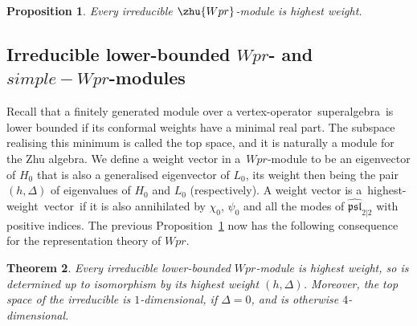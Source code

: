\documentclass[10pt,a4paper]{amsart}
\numberwithin{equation}{section}
\newcommand{\kk}{\mathsf{k}} %
\newcommand{\alg}[1]{\mathfrak{#1}} %
\newcommand{\VOA}[1]{\mathsf{#1}} %
\newcommand{\affine}[1]{\widehat{#1}}
\newcommand{\AKMSA}[3]{\affine{\alg{#1}}_{#2 \vert #3}} %
\newcommand{\apsl}{\AKMSA{psl}{2}{2}}
\newcommand{\uwalg}[2]{\VOA{W}^{#1}_{\mathrm{#2}}} %
\newcommand{\swalg}[2]{\VOA{W}_{#1}^{\mathrm{#2}}} %
\newcommand{\upr}[1][\kk]{\uwalg{#1}{pr}} %
\newcommand{\spr}[1][\kk]{\swalg{#1}{pr}} %
\newcommand{\hw}{highest-weight}
\newcommand{\hwv}{\hw\ vector}
\newcommand{\vo}{vertex-operator}
\newcommand{\svoa}{\vo\ superalgebra}
\newtheorem{Theorem}{Theorem}[section]
\newtheorem{Proposition}[Theorem]{Proposition}
\def\boldsymbol#1{#1}
\def\smash#1{#1}
\def\upr{Wpr}
\def\spr{simple-Wpr}
\begin{document}
\begin{Proposition} \label{prop:irreps_are_hw}
	Every irreducible \smash{$\zhu{\upr}$}-module is highest weight.
\end{Proposition}


\subsection[Irreducible lower-bounded upr- and spr-modules]{Irreducible lower-bounded \smash{$\boldsymbol{\upr}$}- and $\boldsymbol{\spr}$-modules} \label{sec:pslirreps}

Recall that a finitely generated module over a \svoa\ is lower bounded if its conformal weights have a minimal real part.
The subspace realising this minimum is called the top space, and it is naturally a module for the Zhu algebra.
We define a weight vector in a~\smash{$\upr$}-module to be an eigenvector of $H_0$ that is also a generalised eigenvector of $L_0$, its weight then being the pair $(h,\Delta)$ of eigenvalues of $H_0$ and $L_0$ (respectively).
A weight vector is a~\hwv\ if it is also annihilated by $\chi_0$, $\psi_0$ and all the modes of \smash{$\apsl$} with positive indices.
The previous Proposition~\ref{prop:irreps_are_hw} now has the following consequence for the representation theory of \smash{$\upr$}.
%
\begin{Theorem} \label{thm:irreps_are_hw}
	Every irreducible lower-bounded \smash{$\upr$}-module is highest weight, so is determined up to isomorphism by its highest weight $(h,\Delta)$.
	Moreover, the top space of the irreducible is $1$-dimensional, if $\Delta = 0$, and is otherwise $4$-dimensional.
\end{Theorem}
\end{document}
